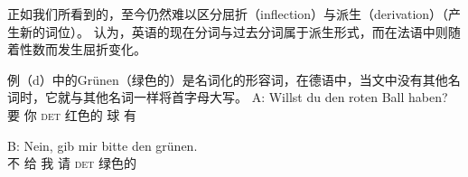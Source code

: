 
正如我们所看到的，至今仍然难以区分屈折（inflection）与派生（derivation）（产生新的词位）。 \citet*[--264]{SWB2003a} 认为，英语的现在分词与过去分词属于派生形式，而在法语中则随着性数而发生屈折变化。

例（d）中的Grünen（绿色的）是名词化的形容词，在德语中，当文中没有其他名词时，它就与其他名词一样将首字母大写。
\ea
\gll A: Willst du den roten Ball haben?\\
	 {} 要 你 \textsc{det} 红色的 球 有\\
\glt {} 

\gll B: Nein, gib mir bitte den grünen.\\
	{} 不 给 我 请 \textsc{det} 绿色的\\
\glt {} 
\z

